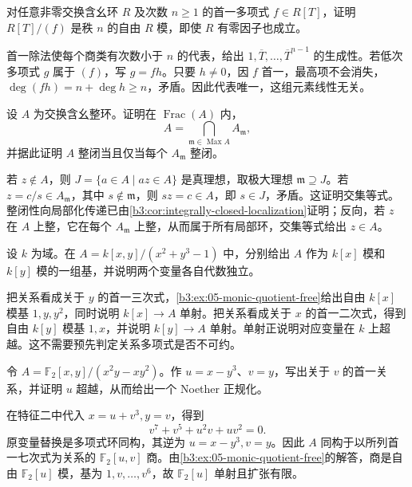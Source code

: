 \begin{exercise}\label{b3:ex:05-monic-quotient-free}
	对任意非零交换含幺环 \(R\) 及次数 \(n\ge1\) 的首一多项式 \(f\in R[T]\)，证明 \(R[T]/(f)\) 是秩 \(n\) 的自由 \(R\) 模，即使 \(R\) 有零因子也成立。
\end{exercise}
\begin{solution}
	首一除法使每个商类有次数小于 \(n\) 的代表，给出 \(1,\overline T,\ldots,\overline T^{n-1}\) 的生成性。若低次多项式 \(g\) 属于 \((f)\)，写 \(g=fh\)。只要 \(h\ne0\)，因 \(f\) 首一，最高项不会消失，\(\deg(fh)=n+\deg h\ge n\)，矛盾。因此代表唯一，这组元素线性无关。
\end{solution}

\begin{exercise}\label{b3:ex:05-normal-local-global}
	设 \(A\) 为交换含幺整环。证明在 \(\operatorname{Frac}(A)\) 内，
	\[
		A=\bigcap_{\mathfrak m\in\operatorname{Max}A}A_{\mathfrak m},
	\]
	并据此证明 \(A\) 整闭当且仅当每个 \(A_{\mathfrak m}\) 整闭。
\end{exercise}
\begin{solution}
	若 \(z\notin A\)，则 \(J=\{a\in A\mid az\in A\}\) 是真理想，取极大理想 \(\mathfrak m\supseteq J\)。若 \(z=c/s\in A_{\mathfrak m}\)，其中 \(s\notin\mathfrak m\)，则 \(sz=c\in A\)，即 \(s\in J\)，矛盾。这证明交集等式。整闭性向局部化传递已由\cref{b3:cor:integrally-closed-localization}证明；反向，若 \(z\) 在 \(A\) 上整，它在每个 \(A_{\mathfrak m}\) 上整，从而属于所有局部环，交集等式给出 \(z\in A\)。
\end{solution}

\begin{exercise}\label{b3:ex:05-two-normalizations}
	设 \(k\) 为域。在 \(A=k[x,y]/(x^2+y^3-1)\) 中，分别给出 \(A\) 作为 \(k[x]\) 模和 \(k[y]\) 模的一组基，并说明两个变量各自代数独立。
\end{exercise}
\begin{solution}
	把关系看成关于 \(y\) 的首一三次式，\cref{b3:ex:05-monic-quotient-free}给出自由 \(k[x]\) 模基 \(1,y,y^2\)，同时说明 \(k[x]\to A\) 单射。把关系看成关于 \(x\) 的首一二次式，得到自由 \(k[y]\) 模基 \(1,x\)，并说明 \(k[y]\to A\) 单射。单射正说明对应变量在 \(k\) 上超越。这不需要预先判定关系多项式是否不可约。
\end{solution}

\begin{exercise}\label{b3:ex:05-finite-field-weights}
	令 \(A=\mathbb F_2[x,y]/(x^2y-xy^2)\)。作 \(u=x-y^3\)、\(v=y\)，写出关于 \(v\) 的首一关系，并证明 \(u\) 超越，从而给出一个 Noether 正规化。
\end{exercise}
\begin{solution}
	在特征二中代入 \(x=u+v^3,y=v\)，得到
	\[
		v^7+v^5+u^2v+uv^2=0.
	\]
	原变量替换是多项式环同构，其逆为 \(u=x-y^3,v=y\)。因此 \(A\) 同构于以所列首一七次式为关系的 \(\mathbb F_2[u,v]\) 商。由\cref{b3:ex:05-monic-quotient-free}的解答，商是自由 \(\mathbb F_2[u]\) 模，基为 \(1,v,\ldots,v^6\)，故 \(\mathbb F_2[u]\) 单射且扩张有限。
\end{solution}

